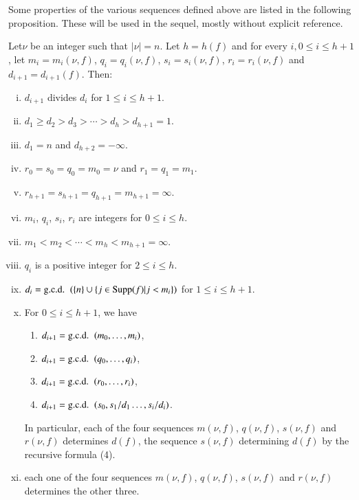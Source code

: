 Some properties of the various sequences defined above are listed in the following proposition. These will be used in the sequel, mostly without explicit reference.

\begin{prop}\label{part1:chap2:sec6:prop6.13}
  Let\pageoriginale $\nu$ be an integer such that $|\nu|=n$. Let $h= h(f)$ and for every $i, 0 \leq i \leq h+1$, let $m_i = m_i (\nu, f)$, $q_i =q_i (\nu, f)$, $s_i = s_i (\nu, f)$, $r_i=r_i(\nu, f)$ and $d_{i+1} = d_{i+1} (f)$. Then:
\begin{enumerate}[(i)]
\item $d_{i+1}$ divides $d_i$ for $1 \leq i \leq h+1$.
\item $d_1 \geq d_2 > d_3 > \cdots > d_h > d_{h+1}=1$.
\item $d_1 =n$ and $d_{h+2}=- \infty$.
\item $r_0 = s_0 = q_0 = m_0= \nu$ and $r_1= q_1= m_1$.
\item $r_{h+1} = s_{h+1} = q_{h+1} = m_{h+1}=\infty$.
\item $m_i$, $q_i$, $s_i$, $r_i$ are integers for $0 \leq i \leq h$.
\item $m_1 < m_2 < \cdots < m_h < m_{h+1}= \infty$.
\item $q_i$ is a positive integer for $2 \leq i \leq h$.
\item $d_i = \text{\gcd}~ ( \{ n\} \cup \{ j \in \Supp (f)| j < m_i \})$ for $1 \leq i \leq h+1$.
\item For $0 \leq i \leq h+1$, we have
  \begin{enumerate}[(1)]
    \item $d_{i+1} = \text{\gcd}~ (m_0 , \ldots , m_i)$,
      \item $d_{i+1} = \text{\gcd}~ (q_0 , \ldots , q_i)$,
        \item $d_{i+1} = \text{\gcd}~ (r_0 , \ldots , r_i)$,
          \item $d_{i+1} = \text{\gcd}~ (s_0,s_1/d_1 \ldots , s_i/d_i)$.
  \end{enumerate}
In particular, each of the four sequences $m (\nu, f)$, $q (\nu, f)$, $s(\nu, f)$ and $r(\nu, f)$ determines $d(f)$, the sequence $s(\nu, f)$ determining $d(f)$ by the recursive formula (4).
\item each one of the four sequences $m(\nu, f)$, $q (\nu, f)$, $s (\nu, f)$ and $r(\nu, f)$ determines the other three.
\end{enumerate}
\end{prop}


